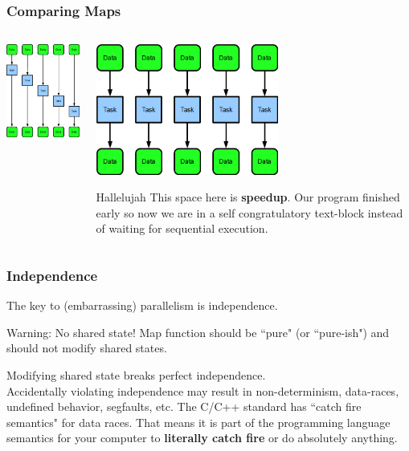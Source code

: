 \documentclass[xcolor=dvipsnames]{beamer}
\begin{document}
	\begin{frame}[fragile] \frametitle{Comparing Maps}
		\begin{columns}
			\begin{column}{0.5\textwidth}
				\includegraphics[width=60mm]{images/map_serial.png}
		    \end{column}
  			\begin{column}{0.5\textwidth}
				\includegraphics[width=60mm]{images/map_parallel.png}\pause
				\begin{block}{Hallelujah}
					This space here is \textbf{speedup}. Our program finished 
					early so now we are in a self congratulatory text-block 
                    instead of waiting for sequential execution.
				\end{block}
		     \end{column}
		\end{columns}
	\end{frame}
%		
	\begin{frame} \frametitle{Independence}
		The key to (embarrassing) parallelism is independence.\pause
		\begin{alertblock}{Warning: No shared state!}
			Map function should be ``pure" (or ``pure-ish") and should not 
            modify shared states.
		\end{alertblock}
		Modifying shared state breaks perfect independence.\\Accidentally
		violating independence may result in non-determinism, data-races, 
		undefined behavior, segfaults, etc. \pause The C/C++ standard has 
		``catch fire semantics" for data races. That means it is part of the 
		programming language semantics for your computer to \textbf{literally
		catch fire} or do absolutely anything.
	\end{frame}
		
\end{document}
